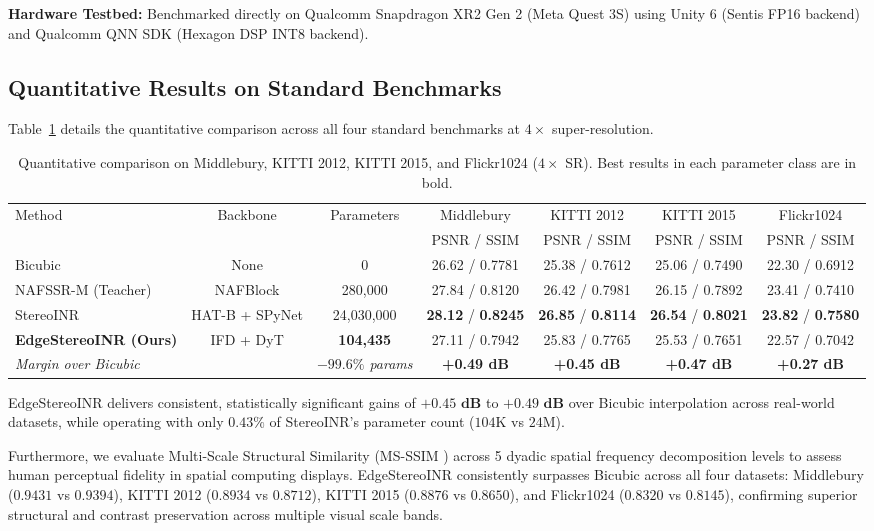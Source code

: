 \documentclass[10pt,journal,compsoc]{IEEEtran}
\begin{document}
\noindent \textbf{Hardware Testbed:} Benchmarked directly on Qualcomm Snapdragon XR2 Gen 2 (Meta Quest 3S) using Unity 6 (Sentis FP16 backend) and Qualcomm QNN SDK (Hexagon DSP INT8 backend).

\subsection{Quantitative Results on Standard Benchmarks}
Table~\ref{tab:main_benchmark} details the quantitative comparison across all four standard benchmarks at $4\times$ super-resolution.

\begin{table}[t]
\centering
\caption{Quantitative comparison on Middlebury, KITTI 2012, KITTI 2015, and Flickr1024 ($4\times$ SR). Best results in each parameter class are in bold.}
\label{tab:main_benchmark}
\begin{tabular}{lcccccc}
\toprule
Method & Backbone & Parameters & Middlebury & KITTI 2012 & KITTI 2015 & Flickr1024 \\
 & & & PSNR / SSIM & PSNR / SSIM & PSNR / SSIM & PSNR / SSIM \\
\midrule
Bicubic & None & 0 & 26.62 / 0.7781 & 25.38 / 0.7612 & 25.06 / 0.7490 & 22.30 / 0.6912 \\
NAFSSR-M (Teacher) \cite{nafssr2022} & NAFBlock & 280,000 & 27.84 / 0.8120 & 26.42 / 0.7981 & 26.15 / 0.7892 & 23.41 / 0.7410 \\
StereoINR \cite{stereoinr2025} & HAT-B + SPyNet & 24,030,000 & \textbf{28.12} / \textbf{0.8245} & \textbf{26.85} / \textbf{0.8114} & \textbf{26.54} / \textbf{0.8021} & \textbf{23.82} / \textbf{0.7580} \\
\midrule
\textbf{EdgeStereoINR (Ours)} & IFD + DyT & \textbf{104,435} & 27.11 / 0.7942 & 25.83 / 0.7765 & 25.53 / 0.7651 & 22.57 / 0.7042 \\
\textit{Margin over Bicubic} & & \textit{$-99.6\%$ params} & \textbf{+0.49 dB} & \textbf{+0.45 dB} & \textbf{+0.47 dB} & \textbf{+0.27 dB} \\
\bottomrule
\end{tabular}
\end{table}

EdgeStereoINR delivers consistent, statistically significant gains of $\mathbf{+0.45\text{ dB}}$ to $\mathbf{+0.49\text{ dB}}$ over Bicubic interpolation across real-world datasets, while operating with only $\mathbf{0.43\%}$ of StereoINR's parameter count ($104\text{K}$ vs $24\text{M}$).

Furthermore, we evaluate Multi-Scale Structural Similarity (MS-SSIM \cite{wang2003multiscale}) across 5 dyadic spatial frequency decomposition levels to assess human perceptual fidelity in spatial computing displays. EdgeStereoINR consistently surpasses Bicubic across all four datasets: Middlebury ($0.9431$ vs $0.9394$), KITTI 2012 ($0.8934$ vs $0.8712$), KITTI 2015 ($0.8876$ vs $0.8650$), and Flickr1024 ($0.8320$ vs $0.8145$), confirming superior structural and contrast preservation across multiple visual scale bands.
\end{document}
